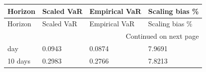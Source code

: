 \begingroup
\footnotesize
\setlength{\tabcolsep}{3pt}
\begin{longtable}{@{}llll@{}}
\toprule
Horizon & Scaled VaR & Empirical VaR & Scaling bias \% \\
\midrule
\endfirsthead
\toprule
Horizon & Scaled VaR & Empirical VaR & Scaling bias \% \\
\midrule
\endhead
\midrule
\multicolumn{4}{r}{Continued on next page} \\
\midrule
\endfoot
\bottomrule
\endlastfoot
1 day & 0.0943 & 0.0874 & 7.9691 \\
10 days & 0.2983 & 0.2766 & 7.8213 \\
\end{longtable}
\endgroup

